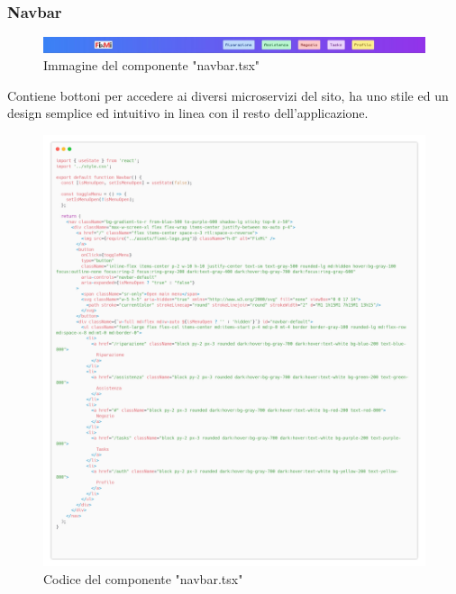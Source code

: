 \documentclass{report}
\begin{document}
\subsubsection{Navbar}
\begin{figure}[H]
	\centering\includegraphics[width=1\textwidth]{images/navbar.jpg}
	\caption{Immagine del componente "navbar.tsx"}
\end{figure}
Contiene bottoni per accedere ai diversi microservizi del sito, ha uno stile ed un design semplice ed intuitivo in linea con il resto dell'applicazione.
\begin{figure}[H]
	\centering\includegraphics[width=1\textwidth]{images/navbar-carbon.png}
	\caption{Codice del componente "navbar.tsx"}
\end{figure}
\end{document}
